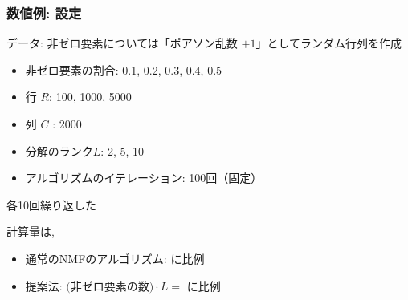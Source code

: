 \documentclass[dvipdfmx, dvipsnames]{beamer}
\begin{document}
\begin{frame}
\frametitle{数値例: 設定}

データ: 非ゼロ要素については「ポアソン乱数 $+1$」としてランダム行列を作成

\vfill

\begin{itemize}
\item 非ゼロ要素の割合: 0.1, 0.2, 0.3, 0.4, 0.5
\item 行 $R$: 100, 1000, 5000
\item 列 $C$ :  2000
\item 分解のランク$L$: 2, 5, 10
\item アルゴリズムのイテレーション: 100回（固定）
\end{itemize}
各10回繰り返した

\vfill

計算量は, 
\begin{itemize}
\item 通常のNMFのアルゴリズム: {\color{RoyalBlue}{$R\cdot C \cdot L$}}に比例
\item 提案法: $\mbox{(非ゼロ要素の数)} \cdot L=$ {} に比例
\end{itemize}
\end{frame}
\end{document}
